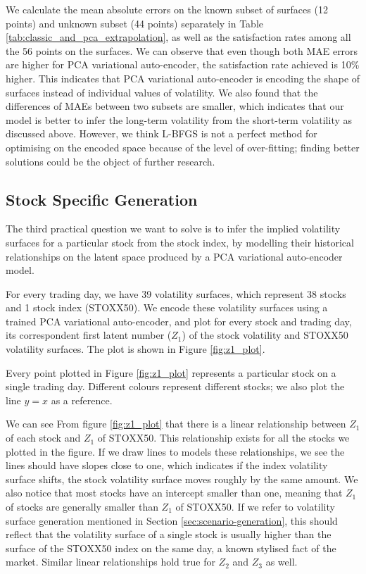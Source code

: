 \documentclass[format=sigconf]{acmart}
\begin{document}
We calculate the mean absolute errors on the known subset of surfaces (12 points) and unknown subset (44 points) separately in Table \ref{tab:classic_and_pca_extrapolation}, as well as the satisfaction rates among all the 56 points on the surfaces. We can observe that even though both MAE errors are higher for PCA variational auto-encoder, the satisfaction rate achieved is 10\% higher. This indicates that PCA variational auto-encoder is encoding the shape of surfaces instead of individual values of volatility. We also found that the differences of MAEs between two subsets are smaller, which indicates that our model is better to infer the long-term volatility from the short-term volatility as discussed above. However, we think L-BFGS is not a perfect method for optimising on the encoded space because of the level of over-fitting; finding better solutions could be the object of further research.

\subsection{Stock Specific Generation}
The third practical question we want to solve is to infer the implied volatility surfaces for a particular stock from the stock index, by modelling their historical relationships on the latent space produced by a PCA variational auto-encoder model. 

For every trading day, we have 39 volatility surfaces, which represent 38 stocks and 1 stock index (STOXX50). We encode these volatility surfaces using a trained PCA variational auto-encoder, and plot for every stock and trading day, its correspondent first latent number ($Z_{1}$) of the stock volatility and STOXX50 volatility surfaces. The plot is shown in Figure \ref{fig:z1_plot}.

Every point plotted in Figure \ref{fig:z1_plot} represents a particular stock on a single trading day. Different colours represent different stocks; we also plot the line $y=x$ as a reference.

We can see From figure \ref{fig:z1_plot} that there is a linear relationship between $Z_{1}$ of each stock and $Z_{1}$ of STOXX50. This relationship exists for all the stocks we plotted in the figure. If we draw lines to models these relationships, we see the lines should have slopes close to one, which indicates if the index volatility surface shifts, the stock volatility surface moves roughly by the same amount. We also notice that most stocks have an intercept smaller than one, meaning that $Z_{1}$ of stocks are generally smaller than $Z_{1}$ of STOXX50. If we refer to volatility surface generation mentioned in Section \ref{sec:scenario-generation}, this should reflect that the volatility surface of a single stock is usually higher than the surface of the STOXX50 index on the same day, a known stylised fact of the market. Similar linear relationships hold true for $Z_{2}$ and $Z_{3}$ as well.
\end{document}
